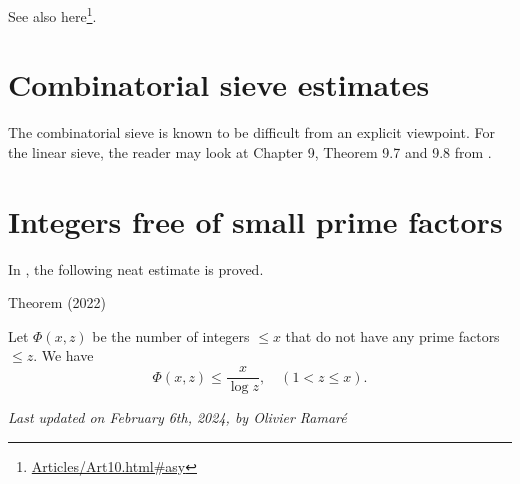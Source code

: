 See also here\footnote{\url{Articles/Art10.html#asy}}.


\section{Combinatorial sieve estimates}


The combinatorial sieve is known to be difficult from an explicit
viewpoint. For the linear sieve, the reader may look at Chapter 9,
Theorem 9.7 and 9.8 from
\cite{Nathanson*96-2}.


\section{Integers free of small prime factors}


In
\cite{Fan*22}, 
the following neat estimate is proved.
\par 
\begin{thm}{Theorem (2022)}

Let $\Phi(x,z)$ be the number of integers $\le x$ that do not have any
prime factors $\le z$. We have
$$
\Phi(x,z)\le \frac{x}{\log z},
\quad(1 < z\le x).
$$
\end{thm}







  
\begin{flushright}\small\sl{}   Last updated on February 6th, 2024, by Olivier Ramar\'e
 \end{flushright}














